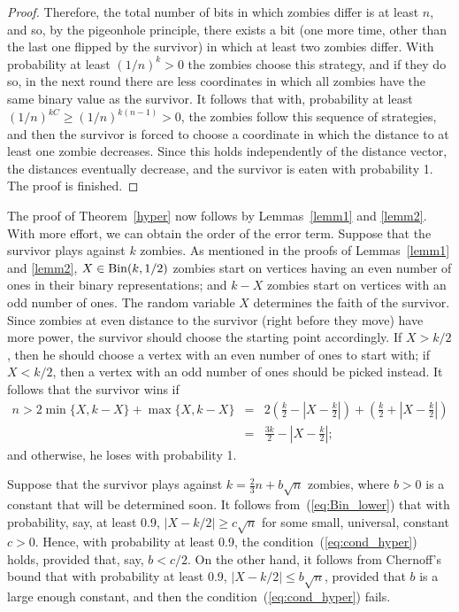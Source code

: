 \documentclass[12pt]{amsart}
\begin{document}
\begin{proof}
Therefore, the total number of bits in which zombies differ is at least $n$, and so, by the pigeonhole principle, there exists a bit (one more time, other than the last one flipped by
the survivor) in which at least two zombies differ. With probability at least $(1/n)^k > 0$ the zombies choose this strategy, and if they do so, in the next round there are less coordinates in which
all zombies have the same binary value as the survivor. It follows that with, probability at least $(1/n)^{kC} \ge (1/n)^{k(n-1)}  > 0$, the zombies follow this sequence of strategies, and then the survivor is forced to
choose a coordinate in which the distance to at least one zombie decreases.  Since this holds independently of the distance vector, the distances eventually decrease, and the survivor is eaten with
probability 1. The proof is finished.
\end{proof}

The proof of Theorem~\ref{hyper} now follows by Lemmas~\ref{lemm1} and \ref{lemm2}. With more effort, we can obtain the order of the error term. Suppose that the survivor plays against $k$ zombies. As mentioned in the
proofs of Lemmas~\ref{lemm1} and \ref{lemm2}, $X \in \mathrm{Bin}(k,1/2)$ zombies start on vertices having an even number of ones in their binary representations; and $k-X$ zombies start on vertices with an odd number of ones. The random
variable $X$ determines the faith of the survivor. Since zombies at even distance to the survivor (right before they move) have more power, the survivor should choose the starting point accordingly.
If $X > k/2$, then he should choose a vertex with an even number of ones to start with; if $X < k/2$, then a vertex with an odd number of ones should be picked instead. It follows that the survivor wins if
\begin{eqnarray}
n > 2 \min\{ X, k-X \} + \max\{ X, k-X \} &=& 2 \left( \frac {k}{2} - \left| X - \frac {k}{2} \right| \right) + \left( \frac {k}{2} + \left| X - \frac {k}{2} \right| \right) \label{eq:cond_hyper} \\
&=& \frac {3k}{2} - \left| X - \frac {k}{2} \right|; \nonumber
\end{eqnarray}
and otherwise, he loses with probability 1.

Suppose that the survivor plays against $k = \frac 23 n + b \sqrt{n}$ zombies, where $b>0$ is a constant that will be determined soon. It follows from~(\ref{eq:Bin_lower}) that with probability, say, at least
0.9, $|X-k/2| \ge c\sqrt{n}$ for some small, universal, constant $c >0$. Hence, with probability at least 0.9, the condition~(\ref{eq:cond_hyper}) holds, provided that, say, $b < c/2$. On the other
hand, it follows from Chernoff's bound that with probability at least 0.9, $|X-k/2| \le b\sqrt{n}$, provided that $b$ is a large enough constant, and then the condition~(\ref{eq:cond_hyper}) fails. 
\end{document}
